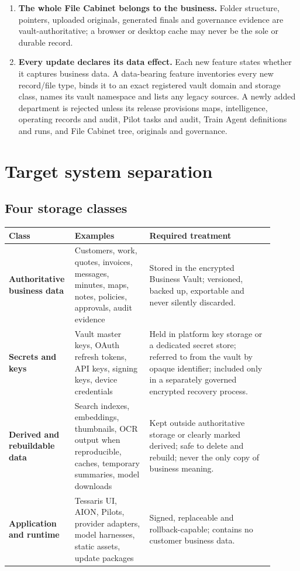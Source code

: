 \documentclass[11pt]{article}
\begin{document}
\begin{enumerate}
  \item \textbf{The whole File Cabinet belongs to the business.} Folder structure, pointers, uploaded originals, generated finals and governance evidence are vault-authoritative; a browser or desktop cache may never be the sole or durable record.
  \item \textbf{Every update declares its data effect.} Each new feature states whether it captures business data. A data-bearing feature inventories every new record/file type, binds it to an exact registered vault domain and storage class, names its vault namespace and lists any legacy sources. A newly added department is rejected unless its release provisions maps, intelligence, operating records and audit, Pilot tasks and audit, Train Agent definitions and runs, and File Cabinet tree, originals and governance.
\end{enumerate}

\section{Target system separation}

\subsection{Four storage classes}

\begin{longtable}{>{\raggedright\arraybackslash\bfseries}p{0.18\linewidth} p{0.27\linewidth} p{0.45\linewidth}}
\toprule
Class & Examples & Required treatment \\
\midrule
\endhead
Authoritative business data & Customers, work, quotes, invoices, messages, minutes, maps, notes, policies, approvals, audit evidence & Stored in the encrypted Business Vault; versioned, backed up, exportable and never silently discarded. \\
Secrets and keys & Vault master keys, OAuth refresh tokens, API keys, signing keys, device credentials & Held in platform key storage or a dedicated secret store; referred to from the vault by opaque identifier; included only in a separately governed encrypted recovery process. \\
Derived and rebuildable data & Search indexes, embeddings, thumbnails, OCR output when reproducible, caches, temporary summaries, model downloads & Kept outside authoritative storage or clearly marked derived; safe to delete and rebuild; never the only copy of business meaning. \\
Application and runtime & Tessaris UI, AION, Pilots, provider adapters, model harnesses, static assets, update packages & Signed, replaceable and rollback-capable; contains no customer business data. \\
\bottomrule
\end{longtable}
\end{document}
